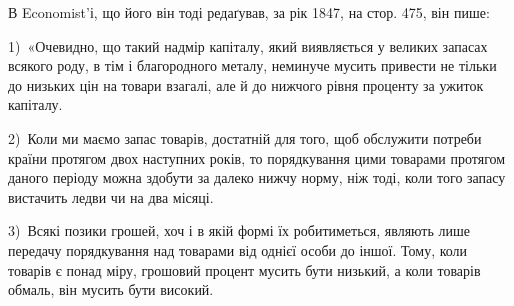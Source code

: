 В Economist’і, що його він тоді редаґував, за рік 1847, на стор. 475,
він пише:

1)~«Очевидно, що такий надмір капіталу, який виявляється у великих запасах
всякого роду, в тім і благородного металу, неминуче мусить привести не тільки
до низьких цін на товари взагалі, але й до нижчого рівня проценту за ужиток
капіталу.

2)~Коли ми маємо запас товарів, достатній для того, щоб обслужити
потреби країни протягом двох наступних років, то порядкування цими
товарами протягом даного періоду можна здобути за далеко нижчу норму, ніж
тоді, коли того запасу вистачить ледви чи на два місяці.

3)~Всякі позики грошей,
хоч і в якій формі їх робитиметься, являють лише передачу порядкування над
товарами від однієї особи до іншої. Тому, коли товарів є понад міру, грошовий
процент мусить бути низький, а коли товарів обмаль, він мусить бути високий.
\parbreak{}  %
